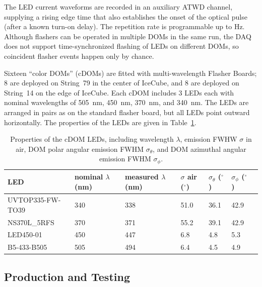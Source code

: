 The LED current waveforms are recorded in an auxiliary ATWD channel, supplying
a rising edge time that also establishes the onset of the optical pulse (after a known
turn-on delay).
The repetition rate is programmable up to \unit[610]{Hz}.
Although flashers can be
operated in multiple DOMs in the same run, the DAQ does not support
time-synchronized flashing of LEDs on different DOMs, so coincident flasher
events happen only by chance. 

Sixteen ``color DOMs'' (cDOMs) are fitted with multi-wavelength
Flasher Boards; 8 are deployed on String~79 in the center of IceCube, and 8
are deployed on String~14 on the edge of IceCube.  Each cDOM includes
3 LEDs each with nominal
wavelengths of 505~nm, 450~nm, 370~nm, and 340~nm. The LEDs are arranged in pairs as on the
standard flasher board, but all LEDs point outward horizontally. 
The properties of the LEDs are given in
Table~\ref{table:cdom_properties}.

\begin{table}
\caption{Properties of the cDOM LEDs, including wavelength $\lambda$,
  emission FWHW $\sigma$ in air, DOM polar
  angular emission FWHM $\sigma_{\theta}$, and DOM azimuthal angular emission
  FWHM $\sigma_{\phi}$.}
\begin{tabularx}{\linewidth}{lXXXXXX}
\toprule
 LED& nominal $\lambda$ (nm) & measured $\lambda$ (nm) & $\sigma$ air ($^{\circ}$) &
 $\sigma_{\theta}$ ($^{\circ}$) & $\sigma_{\phi}$ ($^{\circ}$)\\
\midrule
UVTOP335-FW-TO39 & 340 & 338 & 51.0 & 36.1 & 42.9 \\
NS370L\_5RFS & 370 & 371 & 55.2 & 39.1 & 42.9 \\
LED450-01 & 450 & 447 &	6.8 & 4.8 &	5.3 \\
B5-433-B505 & 505 & 494 & 6.4 &	4.5 & 4.9 \\
\bottomrule
\end{tabularx}
\label{table:cdom_properties}
\end{table}

\subsection{\label{sec:dom_prodtest}Production and Testing}

